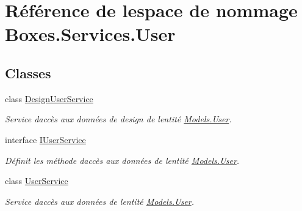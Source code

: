 \hypertarget{namespace_boxes_1_1_services_1_1_user}{}\section{Référence de l\textquotesingle{}espace de nommage Boxes.\+Services.\+User}
\label{namespace_boxes_1_1_services_1_1_user}
\subsection*{Classes}
\begin{DoxyCompactItemize}
\item 
class \hyperlink{class_boxes_1_1_services_1_1_user_1_1_design_user_service}{Design\+User\+Service}
\begin{DoxyCompactList}\small\item\em Service d\textquotesingle{}accès aux données de design de l\textquotesingle{}entité \hyperlink{class_boxes_1_1_models_1_1_user}{Models.\+User}. \end{DoxyCompactList}\item 
interface \hyperlink{interface_boxes_1_1_services_1_1_user_1_1_i_user_service}{I\+User\+Service}
\begin{DoxyCompactList}\small\item\em Définit les méthode d\textquotesingle{}accès aux données de l\textquotesingle{}entité \hyperlink{class_boxes_1_1_models_1_1_user}{Models.\+User}. \end{DoxyCompactList}\item 
class \hyperlink{class_boxes_1_1_services_1_1_user_1_1_user_service}{User\+Service}
\begin{DoxyCompactList}\small\item\em Service d\textquotesingle{}accès aux données de l\textquotesingle{}entité \hyperlink{class_boxes_1_1_models_1_1_user}{Models.\+User}. \end{DoxyCompactList}\end{DoxyCompactItemize}
